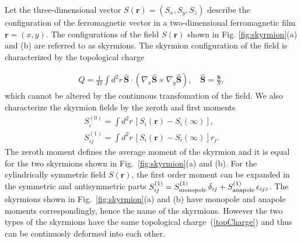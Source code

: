 \documentclass[twocolumn,showpacs,floatfix,nofootinbib,longbibliography]{revtex4-1}
\begin{document}
Let the three-dimensional vector $S(\bm r) = (S_x,S_y,S_z)$ describe the configuration of the ferromagnetic vector in a two-dimensional ferromagnetic film $\bm r = (x,y)$. The configurations of the field $S(\bm r)$ shown in Fig. \ref{fig:skyrmion}(a) and (b) are referred to as skyrmions. The skyrmion configuration of the field is characterized by the topological charge 

\begin{align}
	Q = \frac{1}{4\pi} \int d^2r \, \hat {\bm S}\cdot (\nabla_x\hat {\bm S}\times\nabla_y\hat {\bm S}), \quad \hat {\bm S}= \frac{\bm S}{S}, 
	\label{topCharge}
\end{align}
which cannot be altered by the continuous transfomation of the field.  We also characterize the skyrmion fields by the zeroth and first moments
\begin{align}
	S^{(0)}_i = \int  d^2r \, \left[S_i(\bm r)-S_i(\infty)\right], \\
	S^{(1)}_{ij} = \int  d^2r \, \left[S_i(\bm r)-S_i(\infty)\right] r_j.
	\label{moments}
\end{align}
The zeroth moment defines the average moment of the skyrmion and it is equal for the two skyrmions shown in Fig.~{\ref{fig:skyrmion}}(a) and (b). For the cylindrically symmetric field $S(\bm r)$, the first order moment can be expanded in the symmetric and antisymmetric parts $S^{(1)}_{ij}=S^{(1)}_{\rm monopole}\,\delta_{ij} + S^{(1)}_{\rm anapole}\,\epsilon_{ijz}$. The skyrmions shown in Fig.~\ref{fig:skyrmion}(a) and (b) have monopole and anapole moments correspondingly, hence the name of the skyrmions. However the two types of the skyrmions have the same topological charge~(\ref{topCharge}) and thus can be continuosly deformed into each other. 



\end{document}

